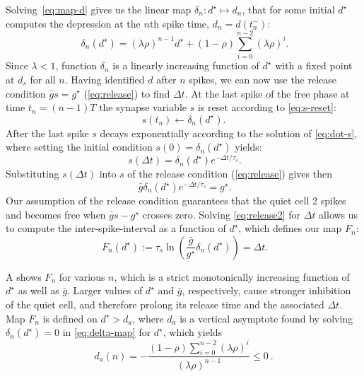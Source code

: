 \documentclass[utf8]{frontiersFPHY} %
\newcommand{\dstar}{d^\star}
\newcommand{\gbar}{\bar g}
\newcommand{\delt}{\Delta t}
\newcommand{\dn}{\delta_n}
\begin{document}
Solving~\eqref{eq:map-d} gives us the linear map $\delta_{n}:d^{\star}\mapsto d_{n}$, that for some initial $d^{\star}$ computes the depression at the $n$th spike time, $d_{n}=d(t_{n}^{-})$:
\begin{equation}
 ~\label{eq:delta-map}
  \delta_{n}(d^{\star}) = (\lambda \rho)^{n-1} d^{\star} + (1-\rho)\sum_{i=0}^{n-2}(\lambda \rho)^{i}.
\end{equation}
Since $\lambda < 1$, function $\delta_{n}$ is a linearly increasing function of $d^{\star}$ with a fixed point at $d_{s}$ for all $n$.
Having identified $d$ after $n$ spikes, we can now use the release condition $\gbar s = g^{\star}$ (\cref{eq:release}) to find $\delt$.
At the last spike of the free phase at time $t_{n}=(n-1)T$ the synapse variable $s$ is reset according to \cref{eq:s-reset}:
\begin{equation}
  s(t_{n})\leftarrow \dn(\dstar).
\end{equation}
After the last spike $s$ decays exponentially according to the solution of \cref{eq:dot-s}, where setting the initial condition $s(0)=\dn(\dstar)$ yields:
\begin{equation}
~\label{eq:s-sol}
  s(\delt)=\dn(\dstar)e^{-\Delta t/\tau_{s}}.
\end{equation}
Substituting $s(\delt)$ into $s$ of the release condition (\cref{eq:release}) gives then
\begin{equation}
 ~\label{eq:release2}
  \gbar \dn(\dstar) e^{-\delt/\tau_{s}}=g^{\star}.
\end{equation}
Our assumption of the release condition guarantees that the quiet cell 2 spikes and becomes free when $\gbar s - g^{\star}$ crosses zero.
Solving \cref{eq:release2} for $\delt$ allows us to compute the inter-spike-interval as a function of $\dstar$, which defines our map $F_n$:
\begin{equation}
 ~\label{eq:Fn-map}
  F_{n}(d^{\star}):=\tau_{s}\ln{\left(\frac{\gbar }{g^{\star}} \delta_{n}(d^{\star})\right)}= \delt.
\end{equation}

A shows $F_n$ for various $n$, which is a strict monotonically increasing function of $d^{\star}$ as well as $\gbar$.
Larger values of $d^{\star}$ and $\gbar$, respectively, cause stronger inhibition of the quiet cell, and therefore prolong its release time and the associated $\delt$.
Map $F_{n}$ is defined on $d^{\star}>d_{a}$, where $d_{a}$ is a vertical asymptote found by solving $\delta_{n}(\dstar)=0$ in \cref{eq:delta-map} for $\dstar$, which yields
\begin{equation}
  d_{a}(n)=-\frac{(1-\rho)\sum_{i=0}^{n-2}(\lambda \rho)^{i}}{ (\lambda \rho)^{n-1} }\leq 0~\label{eq:da}.
\end{equation}
\end{document}
